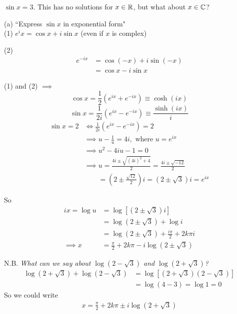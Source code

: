 \documentclass[10pt]{scrartcl}
\begin{document}
\begin{examples}
$\sin x = 3$. This has no solutions for $x \in\mathbb{R}$, but what about $x \in\mathbb{C}$?

(a) ``Express $\sin x$ in exponential form"\\

(1) $e^ix = \cos x + i\sin x$ (even if $x$ is complex)

(2) \begin{align*}
  e^{-ix} &= \cos(-x) + i\sin(-x)\\
  &= \cos x - i\sin x
\end{align*}

(1) and (2) $\implies$ 
\[\cos x = \frac{1}{2}(e^{ix} + e^{-ix}) \equiv \cosh(ix)\]
\[\sin x = \frac{1}{2i}(e^{ix} - e^{-ix}) \equiv \frac{\sinh(ix)}{i}\]
\begin{align*}
  \sin x = 2 &\iff \frac{1}{2i}(e^{ix} - e^{-ix}) = 2\\
  &\implies  u - \frac{1}{u} = 4i, \mbox{ where $u = e^{ix}$}\\
  &\implies u^2 - 4iu -1 = 0\\
  &\implies u = \frac{4i\pm \sqrt{(4i)^2 + 4}}{2} = \frac{4i \pm \sqrt{-12}}{2}\\
  & \qquad = \left(2 \pm \frac{\sqrt{12}}{2}\right)i = (2 \pm \sqrt{3})i = e^{ix}
\end{align*}

So
\begin{align*}
  ix = \log u &= \log[(2 \pm \sqrt{3})i]\\
  &= \log(2 \pm\sqrt{3}) + \log i\\
  &= \log(2 \pm \sqrt{3}) + \frac{i\pi}{2} + 2k\pi i\\[.2cm]
  \implies x&= \frac{\pi}{2} + 2k\pi -i\log(2 \pm \sqrt{3})
\end{align*}
\end{examples}


N.B. \emph{What can we say about $\log(2-\sqrt{3})$ and $\log(2 + \sqrt{3})$?}
\begin{align*}
  \log(2 + \sqrt{3}) + \log(2-\sqrt{3}) &= \log[(2+\sqrt{3})(2-\sqrt{3})]\\
  &= \log(4-3) = \log 1 = 0
\end{align*}
So we could write 
\begin{align*}
  x = \frac{\pi}{2} + 2k\pi \pm i \log(2 + \sqrt{3})
\end{align*}


\begin{center}
\end{center}
\end{document}
